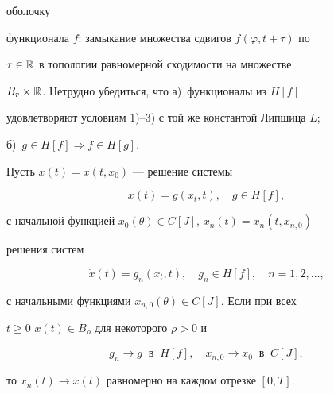 оболочку


функционала $f$: замыкание множества сдвигов $f(\varphi,t+\tau)$ по


$\tau\in\Bbb R$ в топологии равномерной сходимости на множестве


$B_r\times\Bbb R$. Нетрудно убедиться, что а)~функционалы из $H[f]$


удовлетворяют условиям 1)--3) с той же константой Липшица $L$;


б)~$g\in H[f]\Rightarrow f\in H[g]$.





\begin{lem}


Пусть $x(t)=x(t,x_0)$ --- решение системы


\begin{equation}


\Dot x(t)=g(x_t,t),\quad g\in H[f],


\end{equation}


с начальной функцией $x_0(\theta)\in C[J]$, $x_n(t)=x_n(t,x_{n,0})$ ---


решения систем


\begin{equation}


\Dot x(t)=g_n(x_t,t),\quad g_n\in H[f],\quad n=1,2,\dotsc,


\end{equation}


с начальными функциями $x_{n,0}(\theta)\in C[J]$. Если при всех


$t\geqslant 0$\; $x(t)\in B_{\rho}$ для некоторого $\rho>0$ и


$$


g_n\to g \ \text{ в }\ H[f], \quad x_{n,0}\to x_0 \ \text{ в }


\ C[J],


$$


то $x_n(t)\to x(t)$ равномерно на каждом отрезке $[0,T]$.


\end{lem}





